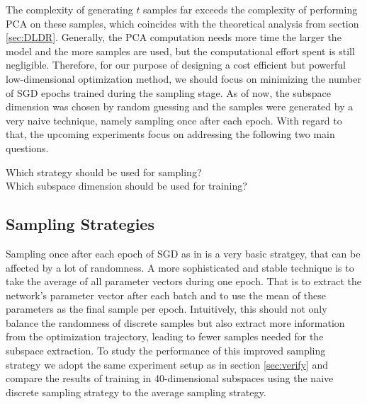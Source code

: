 \documentclass[11pt, a4paper]{article}
\begin{document}
The complexity of generating $t$ samples far exceeds the complexity of performing PCA on these samples, which coincides with the theoretical analysis from section \ref{sec:DLDR}. Generally, the PCA computation needs more time the larger the model and the more samples are used, but the computational effort spent is still negligible. Therefore, for our purpose of designing a cost efficient but powerful low-dimensional optimization method, we should focus on minimizing the number of SGD epochs trained during the sampling stage. As of now, the subspace dimension was chosen by random guessing and the samples were generated by a very naive technique, namely sampling once after each epoch. With regard to that, the upcoming experiments focus on addressing the following two main questions.

\begin{center}
Which strategy should be used for sampling? \\
Which subspace dimension should be used for training?
\end{center}

\subsection{Sampling Strategies}

Sampling once after each epoch of SGD as in \cite{Paper} is a very basic stratgey, that can be affected by a lot of randomness. A more sophisticated and stable technique is to take the average of all parameter vectors during one epoch. That is to extract the network's parameter vector after each batch and to use the mean of these parameters as the final sample per epoch. Intuitively, this should not only balance the randomness of discrete samples but also extract more information from the optimization trajectory, leading to fewer samples needed for the subspace extraction. To study the performance of this improved sampling strategy we adopt the same experiment setup as in section \ref{sec:verify} and compare the results of training in 40-dimensional subspaces using the naive discrete sampling strategy to the average sampling strategy.
\end{document}
